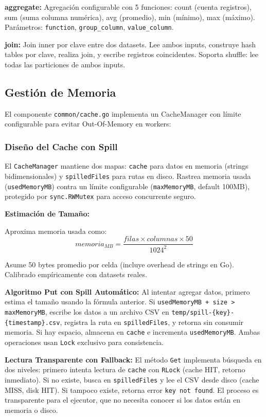 \documentclass[conference]{IEEEtran}
\begin{document}
\textbf{aggregate:} Agregación configurable con 5 funciones: count (cuenta registros), sum (suma columna numérica), avg (promedio), min (mínimo), max (máximo). Parámetros: \texttt{function}, \texttt{group\_column}, \texttt{value\_column}.

\textbf{join:} Join inner por clave entre dos datasets. Lee ambos inputs, construye hash tables por clave, realiza join, y escribe registros coincidentes. Soporta shuffle: lee todas las particiones de ambos inputs.

\subsection{Gestión de Memoria}

El componente \texttt{common/cache.go} implementa un CacheManager con límite configurable para evitar Out-Of-Memory en workers:

\subsubsection{Diseño del Cache con Spill}

El \texttt{CacheManager} mantiene dos mapas: \texttt{cache} para datos en memoria (strings bidimensionales) y \texttt{spilledFiles} para rutas en disco. Rastrea memoria usada (\texttt{usedMemoryMB}) contra un límite configurable (\texttt{maxMemoryMB}, default 100MB), protegido por \texttt{sync.RWMutex} para acceso concurrente seguro.

\textbf{Estimación de Tamaño:} 

Aproxima memoria usada como:
\begin{equation}
memoria_{MB} = \frac{filas \times columnas \times 50}{1024^2}
\end{equation}

Asume 50 bytes promedio por celda (incluye overhead de strings en Go). Calibrado empíricamente con datasets reales.

\textbf{Algoritmo Put con Spill Automático:} Al intentar agregar datos, primero estima el tamaño usando la fórmula anterior. Si \texttt{usedMemoryMB + size > maxMemoryMB}, escribe los datos a un archivo CSV en \texttt{temp/spill-\{key\}-\{timestamp\}.csv}, registra la ruta en \texttt{spilledFiles}, y retorna sin consumir memoria. Si hay espacio, almacena en \texttt{cache} e incrementa \texttt{usedMemoryMB}. Ambas operaciones usan \texttt{Lock} exclusivo para consistencia.

\textbf{Lectura Transparente con Fallback:} El método \texttt{Get} implementa búsqueda en dos niveles: primero intenta lectura de \texttt{cache} con \texttt{RLock} (cache HIT, retorno inmediato). Si no existe, busca en \texttt{spilledFiles} y lee el CSV desde disco (cache MISS, disk HIT). Si tampoco existe, retorna error \texttt{key not found}. El proceso es transparente para el ejecutor, que no necesita conocer si los datos están en memoria o disco.
\end{document}
